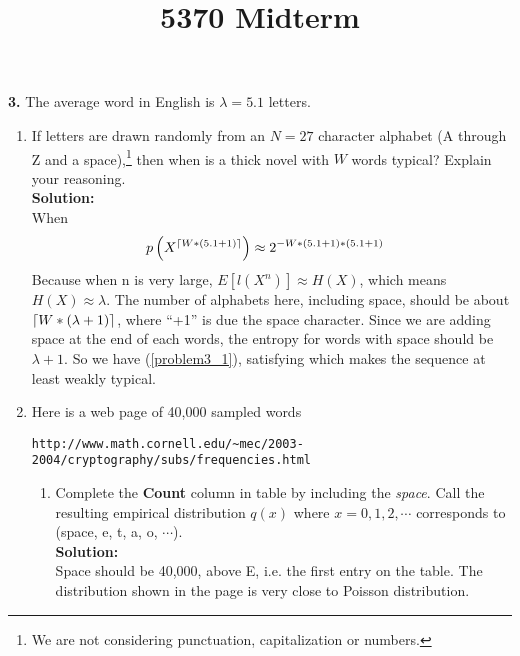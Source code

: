 \documentclass{assignment}
\title{5370 Midterm}
\begin{document}
\textbf{3.}
\label{SquishyBear}
The average word in English is $\lambda =5.1$ letters.
\begin{enumerate}
\item  If letters are drawn randomly from an $N=27$ character alphabet (A through Z and a space),\footnote{
    We are not considering punctuation, capitalization or numbers.
  }
  then when is a thick novel with $W$ words typical? Explain your reasoning. \\

  \textbf{Solution:} \\
  When
  \begin{align}
    p\left(X^{\left \lceil W*(5.1 + 1) \right \rceil}\right) & \approx 2^{-W*(5.1 + 1)*(5.1 + 1)} \label{problem3_1}
  \end{align}
  Because when n is very large, $E[l(X^n)] \approx H(X)$, which means $H(X) \approx \lambda$. The number of alphabets
  here, including space, should be about $\left \lceil W * (\lambda + 1) \right \rceil$, where ``+1'' is due the space character. Since
  we are adding space at the end of each words, the entropy for words with space should be $\lambda + 1$. So we have
  (\ref{problem3_1}), satisfying which makes the sequence at least weakly typical.

\item Here is a web page of 40,000 sampled words
  \begin{center}
    \verb"http://www.math.cornell.edu/~mec/2003-2004/cryptography/subs/frequencies.html"
  \end{center}
  \begin{enumerate}
  \item Complete the {\bf Count} column in table by including the {\em space}. Call the resulting empirical
    distribution $q(x)$ where $x=0,1,2,\cdots$ corresponds to (space, e, t, a, o, $\cdots$). \\
    \textbf{Solution:} \\
    Space should be 40,000, above E, i.e. the first entry on the table.
    The distribution shown in the page is very close to Poisson distribution.


\end{enumerate}
\end{enumerate}
\end{document}
